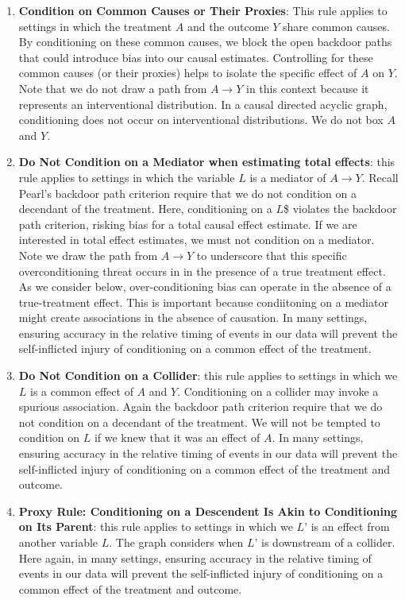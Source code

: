 \documentclass[
  single column]{article}
\begin{document}
\begin{enumerate}
\def\labelenumi{\arabic{enumi}.}
\setcounter{enumi}{1}
\item
  \textbf{Condition on Common Causes or Their Proxies}: This rule
  applies to settings in which the treatment \(A\) and the outcome \(Y\)
  share common causes. By conditioning on these common causes, we block
  the open backdoor paths that could introduce bias into our causal
  estimates. Controlling for these common causes (or their proxies)
  helps to isolate the specific effect of \(A\) on \(Y\). Note that we
  do not draw a path from \(A \to Y\) in this context because it
  represents an interventional distribution. In a causal directed
  acyclic graph, conditioning does not occur on interventional
  distributions. We do not box \(A\) and \(Y\).
\item
  \textbf{Do Not Condition on a Mediator when estimating total effects}:
  this rule applies to settings in which the variable \(L\) is a
  mediator of \(A \to Y\). Recall Pearl's backdoor path criterion
  require that we do not condition on a decendant of the treatment.
  Here, conditioning on a \(L\)\$ violates the backdoor path criterion,
  risking bias for a total causal effect estimate. If we are interested
  in total effect estimates, we must not condition on a mediator. Note
  we draw the path from \(A \to Y\) to underscore that this specific
  overconditioning threat occurs in in the presence of a true treatment
  effect. As we consider below, over-conditioning bias can operate in
  the absence of a true-treatment effect. This is important because
  condiitoning on a mediator might create associations in the absence of
  causation. In many settings, ensuring accuracy in the relative timing
  of events in our data will prevent the self-inflicted injury of
  conditioning on a common effect of the treatment.
\item
  \textbf{Do Not Condition on a Collider}: this rule applies to settings
  in which we \(L\) is a common effect of \(A\) and \(Y\). Conditioning
  on a collider may invoke a spurious association. Again the backdoor
  path criterion require that we do not condition on a decendant of the
  treatment. We will not be tempted to condition on \(L\) if we knew
  that it was an effect of \(A\). In many settings, ensuring accuracy in
  the relative timing of events in our data will prevent the
  self-inflicted injury of conditioning on a common effect of the
  treatment and outcome.
\item
  \textbf{Proxy Rule: Conditioning on a Descendent Is Akin to
  Conditioning on Its Parent}: this rule applies to settings in which we
  \(L’\) is an effect from another variable \(L\). The graph considers
  when \(L’\) is downstream of a collider. Here again, in many settings,
  ensuring accuracy in the relative timing of events in our data will
  prevent the self-inflicted injury of conditioning on a common effect
  of the treatment and outcome.
\end{enumerate}
\end{document}
